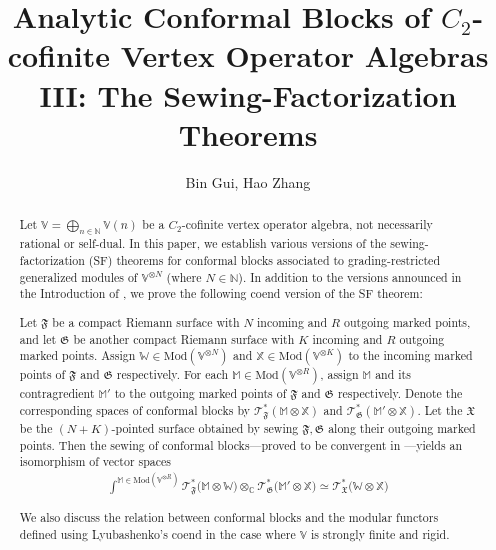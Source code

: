\documentclass[11pt,b5paper,notitlepage]{article}
\title{Analytic Conformal Blocks of $C_2$-cofinite Vertex Operator Algebras III: The Sewing-Factorization Theorems}
\author{{\sc Bin Gui, Hao Zhang}
}
\date{}
\theoremstyle{definition}
\theoremstyle{plain}
\newcommand{\Vbb}{\mathbb V}
\newcommand{\Xbb}{\mathbb X}
\newcommand{\Wbb}{\mathbb W}
\newcommand{\Mbb}{\mathbb M}
\newcommand{\Cbb}{\mathbb C}
\newcommand{\Nbb}{\mathbb N}
\newcommand{\<}{\left\langle}
\renewcommand{\>}{\right\rangle}
\newcommand{\fx}{\mathfrak{X}}
\newcommand{\ST}{\mathscr{T}}
\newcommand{\Mod}{\mathrm{Mod}}
\newcommand{\ff}{\mathfrak{F}}
\newcommand{\fg}{\mathfrak{G}}
\numberwithin{equation}{section}
\begin{document}
\sloppy %
	\setcounter{section}{-1}
	
	
	
	\maketitle
	
	
\newcommand\blfootnote[1]{%
	\begingroup
	\renewcommand\thefootnote{}\footnote{#1}%
	\addtocounter{footnote}{-1}%
	\endgroup
}



\begin{abstract}
Let $\Vbb=\bigoplus_{n\in\Nbb}\Vbb(n)$ be a $C_2$-cofinite vertex operator algebra, not necessarily rational or self-dual. In this paper, we establish various versions of the sewing-factorization (SF) theorems for conformal blocks associated to grading-restricted generalized modules of $\Vbb^{\otimes N}$ (where $N\in\Nbb$). In addition to the versions announced in the Introduction of \cite{GZ1}, we prove the following coend version of the SF theorem:

Let $\ff$ be a compact Riemann surface with $N$ incoming and $R$ outgoing marked points, and let $\fg$ be another compact Riemann surface with $K$ incoming and $R$ outgoing marked points. Assign $\Wbb\in\Mod(\Vbb^{\otimes N})$ and $\Xbb\in\Mod(\Vbb^{\otimes K})$ to the incoming marked points of $\ff$ and $\fg$ respectively. For each $\Mbb\in\Mod(\Vbb^{\otimes R})$, assign $\Mbb$ and its contragredient $\Mbb'$ to the outgoing marked points of $\ff$ and $\fg$ respectively. Denote the corresponding spaces of conformal blocks by $\ST^*_\ff(\Mbb\otimes\Xbb)$ and $\ST^*_\fg(\Mbb'\otimes\Xbb)$. Let the $\fx$ be the $(N+K)$-pointed surface obtained by sewing $\ff,\fg$ along their outgoing marked points. Then the sewing of conformal blocks---proved to be convergent in \cite{GZ2}---yields an isomorphism of vector spaces
\begin{align*}
\int^{\Mbb\in\Mod(\Vbb^{\otimes R})}\ST^*_\ff\big(\Mbb\otimes\Wbb\big)\otimes_\Cbb\ST^*_\fg\big(\Mbb'\otimes\Xbb\big)\simeq\ST_\fx^*\big(\Wbb\otimes \Xbb\big)
\end{align*}

We also discuss the relation between conformal blocks and the modular functors defined using Lyubashenko's coend in the case where $\Vbb$ is strongly finite and rigid. 
\end{abstract}
\end{document}
